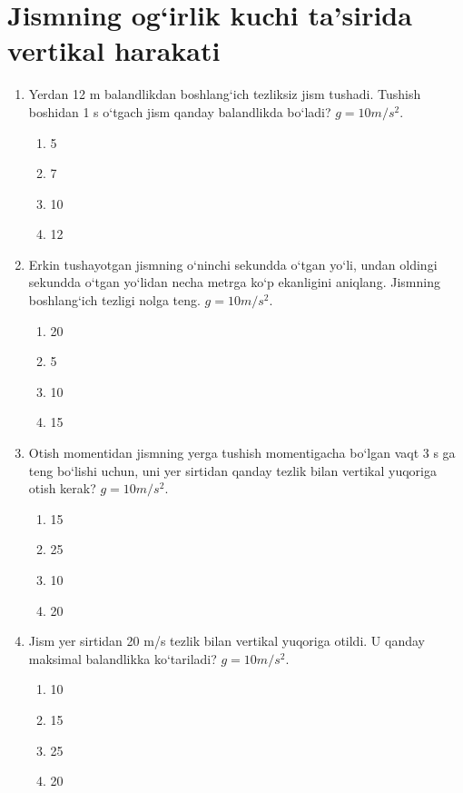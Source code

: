 \section{Jismning og`irlik kuchi ta'sirida vertikal harakati}

\begin{enumerate}

\item Yerdan 12 m balandlikdan boshlang‘ich tezliksiz jism tushadi. Tushish boshidan 1 s o‘tgach jism qanday balandlikda bo‘ladi? $g=10 m/s^2$.
\begin{enumerate}[label=\Alph*)]
\item 5
\item 7
\item 10
\item 12
\end{enumerate}

\item Erkin tushayotgan jismning o‘ninchi sekundda o‘tgan yo‘li, undan oldingi sekundda o‘tgan yo‘lidan necha metrga ko‘p ekanligini aniqlang. Jismning boshlang‘ich tezligi nolga teng. $g=10 m/s^2$.
\begin{enumerate}[label=\Alph*)]
\item 20
\item 5
\item 10
\item 15
\end{enumerate}

\item Otish momentidan jismning yerga tushish momentigacha bo‘lgan vaqt 3 s ga teng bo‘lishi uchun, uni yer sirtidan qanday tezlik bilan vertikal yuqoriga otish kerak? $g=10 m/s^2$.
\begin{enumerate}[label=\Alph*)]
\item 15
\item 25
\item 10
\item 20
\end{enumerate}

\item Jism yer sirtidan 20 m/s tezlik bilan vertikal yuqoriga otildi. U qanday maksimal balandlikka ko‘tariladi? $g=10 m/s^2$.
\begin{enumerate}[label=\Alph*)]
\item 10
\item 15
\item 25
\item 20
\end{enumerate}


\end{enumerate}
